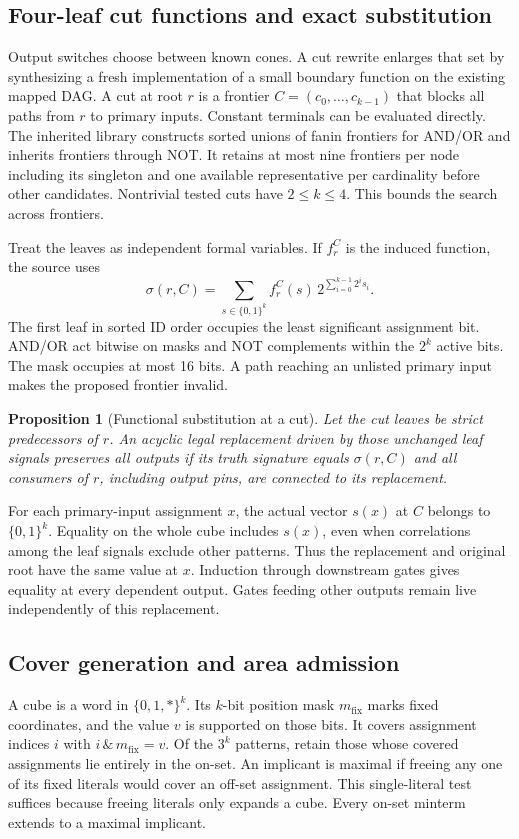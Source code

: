 \documentclass[journal,10pt]{IEEEtran}
\newtheorem{proposition}{Proposition}
\begin{document}
\subsection{Four-leaf cut functions and exact substitution}
\label{sec:cuts}
Output switches choose between known cones. A cut rewrite enlarges that set by synthesizing a fresh implementation of a small boundary function on the existing mapped DAG. A cut at root \(r\) is a frontier \(C=(c_0,\ldots,c_{k-1})\) that blocks all paths from \(r\) to primary inputs. Constant terminals can be evaluated directly. The inherited library constructs sorted unions of fanin frontiers for AND/OR and inherits frontiers through NOT. It retains at most nine frontiers per node including its singleton and one available representative per cardinality before other candidates. Nontrivial tested cuts have \(2\le k\le4\). This bounds the search across frontiers.

Treat the leaves as independent formal variables. If \(f_r^C\) is the induced function, the source uses
\begin{equation}
\sigma(r,C)=\sum_{s\in\{0,1\}^k} f_r^C(s)\,2^{\sum_{i=0}^{k-1}2^i s_i}.
 \label{eq:mask}
\end{equation}
The first leaf in sorted ID order occupies the least significant assignment bit. AND/OR act bitwise on masks and NOT complements within the \(2^k\) active bits. The mask occupies at most 16 bits. A path reaching an unlisted primary input makes the proposed frontier invalid.

\begin{proposition}[Functional substitution at a cut]
Let the cut leaves be strict predecessors of \(r\). An acyclic legal replacement driven by those unchanged leaf signals preserves all outputs if its truth signature equals \(\sigma(r,C)\) and all consumers of \(r\), including output pins, are connected to its replacement.
\end{proposition}
\begin{IEEEproof}
For each primary-input assignment \(x\), the actual vector \(s(x)\) at \(C\) belongs to \(\{0,1\}^k\). Equality on the whole cube includes \(s(x)\), even when correlations among the leaf signals exclude other patterns. Thus the replacement and original root have the same value at \(x\). Induction through downstream gates gives equality at every dependent output. Gates feeding other outputs remain live independently of this replacement.
\end{IEEEproof}

\subsection{Cover generation and area admission}
A cube is a word in \(\{0,1,*\}^k\). Its \(k\)-bit position mask \(m_{\mathrm{fix}}\) marks fixed coordinates, and the value \(v\) is supported on those bits. It covers assignment indices \(i\) with \(i\,\&\,m_{\mathrm{fix}}=v\). Of the \(3^k\) patterns, retain those whose covered assignments lie entirely in the on-set. An implicant is maximal if freeing any one of its fixed literals would cover an off-set assignment. This single-literal test suffices because freeing literals only expands a cube. Every on-set minterm extends to a maximal implicant.
\end{document}
